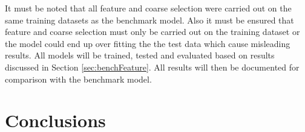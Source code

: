 It must be noted that all feature and coarse selection were carried out on the same training datasets as the benchmark model. Also it must be ensured that feature and coarse selection must only be carried out on the training dataset or the model could end up over fitting the the test data which cause misleading results. All models will be trained, tested and evaluated based on results discussed in Section \ref{sec:benchFeature}. All results will then be documented for comparison with the benchmark model. 


\section{Conclusions}

